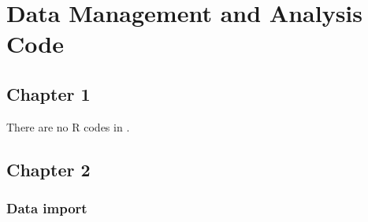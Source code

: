\setcounter{secnumdepth}{0}
\chapter{Data Management and Analysis Code}

\section{Chapter 1}

There are no R codes in .

\section{Chapter 2}

\subsection{Data import}
\label{R.1}
\begin{singlespace}\small
    
\end{singlespace}

%

%

%

%


